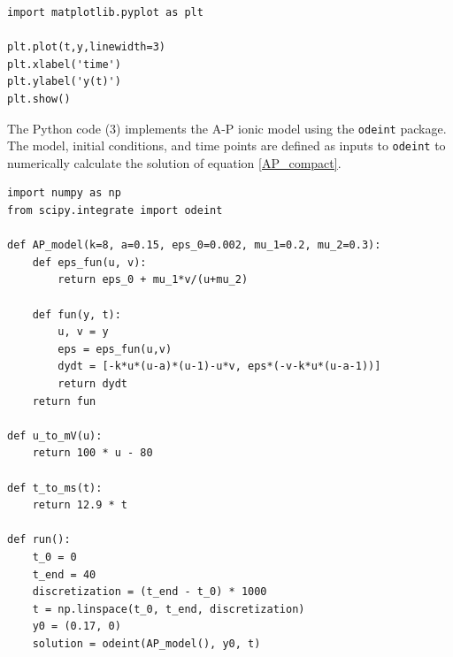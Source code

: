 \documentclass[11pt,a4paper]{article}
\begin{document}
\lstset{language=Python}
\lstset{frame=lines}
\lstset{basicstyle=\footnotesize}
\begin{lstlisting}
import matplotlib.pyplot as plt

plt.plot(t,y,linewidth=3)
plt.xlabel('time')
plt.ylabel('y(t)')
plt.show()
\end{lstlisting}
\newpage

The Python code (3) implements the A-P ionic model using the \verb|odeint| package. The model, initial conditions, and time points are defined as inputs to \verb|odeint| to numerically calculate the solution of equation \eqref{AP_compact}.

\lstset{language=Python}
\lstset{frame=lines}
\lstset{basicstyle=\footnotesize}
\begin{lstlisting}
import numpy as np  
from scipy.integrate import odeint 

def AP_model(k=8, a=0.15, eps_0=0.002, mu_1=0.2, mu_2=0.3):
	def eps_fun(u, v):
		return eps_0 + mu_1*v/(u+mu_2)

	def fun(y, t):
		u, v = y
		eps = eps_fun(u,v)
		dydt = [-k*u*(u-a)*(u-1)-u*v, eps*(-v-k*u*(u-a-1))]
		return dydt
	return fun

def u_to_mV(u):
	return 100 * u - 80

def t_to_ms(t):
	return 12.9 * t

def run():
	t_0 = 0
	t_end = 40
	discretization = (t_end - t_0) * 1000
	t = np.linspace(t_0, t_end, discretization)
	y0 = (0.17, 0)
	solution = odeint(AP_model(), y0, t)
\end{lstlisting}
\end{document}
